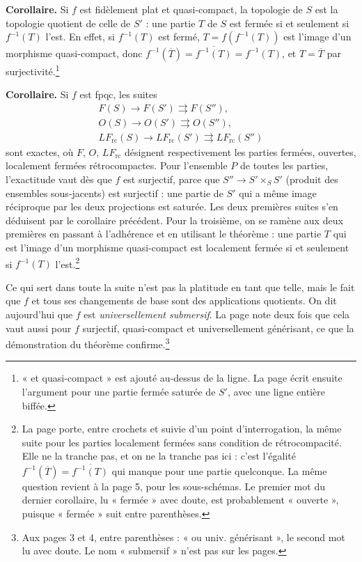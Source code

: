\documentclass[11pt,a4paper]{article}
\begin{document}
\textbf{Corollaire.} Si $f$ est fidèlement plat et quasi-compact, la topologie
de $S$ est la topologie quotient de celle de $S'$ : une partie $T$ de $S$ est
fermée si et seulement si $f^{-1}(T)$ l'est. En effet, si $f^{-1}(T)$ est
fermé, $T = f(f^{-1}(T))$ est l'image d'un morphisme quasi-compact, donc
$f^{-1}(\overline{T}) = \overline{f^{-1}(T)} = f^{-1}(T)$, et $T = \overline{T}$
par surjectivité.\footnote{« et quasi-compact » est ajouté au-dessus de la
ligne. La page écrit ensuite l'argument pour une partie fermée saturée de $S'$,
avec une ligne entière biffée.}

\textbf{Corollaire.} Si $f$ est fpqc, les suites
\[
\begin{array}{l}
F(S) \to F(S') \rightrightarrows F(S''), \\
O(S) \to O(S') \rightrightarrows O(S''), \\
LF_{\mathrm{rc}}(S) \to LF_{\mathrm{rc}}(S') \rightrightarrows LF_{\mathrm{rc}}(S'')
\end{array}
\]
sont exactes, où $F$, $O$, $LF_{\mathrm{rc}}$ désignent respectivement les
parties fermées, ouvertes, localement fermées rétrocompactes. Pour l'ensemble
$P$ de toutes les parties, l'exactitude vaut dès que $f$ est surjectif, parce
que $S'' \to S' \times_S S'$ (produit des ensembles sous-jacents) est
surjectif : une partie de $S'$ qui a même image réciproque par les deux
projections est saturée. Les deux premières suites s'en déduisent par le
corollaire précédent. Pour la troisième, on se ramène aux deux premières en
passant à l'adhérence et en utilisant le théorème : une partie $T$ qui est
l'image d'un morphisme quasi-compact est localement fermée si et seulement si
$f^{-1}(T)$ l'est.\footnote{La page porte, entre crochets et suivie d'un point
d'interrogation, la même suite pour les parties localement fermées sans
condition de rétrocompacité. Elle ne la tranche pas, et on ne la tranche pas ici :
c'est l'égalité $f^{-1}(\overline{T}) = \overline{f^{-1}(T)}$ qui manque pour
une partie quelconque. La même question revient à la page 5, pour les
sous-schémas. Le premier mot du dernier corollaire, lu « fermée » avec doute,
est probablement « ouverte », puisque « fermée » suit entre parenthèses.}

Ce qui sert dans toute la suite n'est pas la platitude en tant que telle, mais
le fait que $f$ et tous ses changements de base sont des applications
quotients. On dit aujourd'hui que $f$ est \emph{universellement submersif}. La
page note deux fois que cela vaut aussi pour $f$ surjectif, quasi-compact et
universellement générisant, ce que la démonstration du théorème
confirme.\footnote{Aux pages 3 et 4, entre parenthèses : « ou univ.
générisant », le second mot lu avec doute. Le nom « submersif » n'est pas sur
les pages.}
\end{document}
